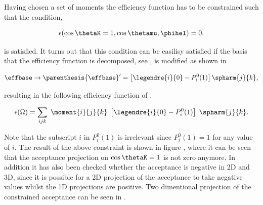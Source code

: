 Having chosen a set of moments the efficiency function has to be constrained such that the
condition,

\begin{equation}
  \centering
  \epsilon(\cos\thetaK = 1, \cos\thetamu, \phihel) = 0.
  \label{eff_func_constr}
\end{equation}

\noindent is satisfied. It turns out that this condition can be easilisy satisfied if the basis that the
efficiency function is decomposed, see , is modified as shown in 

\begin{align}
  \centering
   \effbase \to \parenthesis{\effbase}^\prime = \left[\legendre{i}{0}-P_i^0(1)\right] \spharm{j}{k},
  \label{eff_basis_transform}
  \end{align}

\noindent resulting in the following efficiency function of .

\begin{align}
    \centering
  \epsilon(\Omega) = \sum_{ijk} \; \moment{i}{j}{k} \; \left[\legendre{i}{0}-P_i^0(1)\right] \; \spharm{j}{k}.
  \label{eff_func_new}
\end{align}

\noindent Note that the subscript $i$ in $P_i^0(1)$ is irrelevant since $P_i^0(1)=1$ for any value of $i$.
The result of the above constraint is shown in figure , where it can be seen that the acceptance projection on $\cos\thetaK=1$
is not zero anymore. In addition it has also been checked whether the acceptance is negative in 2D and 3D, since it is possible for a 2D
projection of the acceptance to take negative values whilst the 1D projections are positive. Two dimentional projection of the constrained acceptance
can be seen in .


